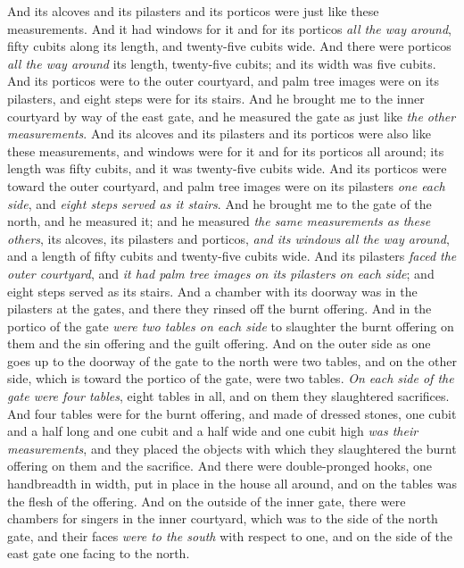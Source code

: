 \begin{biblechapter}
\verse And its alcoves and its pilasters and its porticos were just like these measurements. And it had windows for it and for its porticos \textit{all the way around}, fifty cubits along its length, and twenty-five cubits wide.
\verse And there were porticos \textit{all the way around} its length, twenty-five cubits; and its width was five cubits.
\verse And its porticos were to the outer courtyard, and palm tree images were on its pilasters, and eight steps were for its stairs.
\verse And he brought me to the inner courtyard by way of the east gate, and he measured the gate as just like \textit{the other measurements}.
\verse And its alcoves and its pilasters and its porticos were also like these measurements, and windows were for it and for its porticos all around; its length was fifty cubits, and it was twenty-five cubits wide.
\verse And its porticos were toward the outer courtyard, and palm tree images were on its pilasters \textit{one each side}, and \textit{eight steps served as it stairs}.
\verse And he brought me to the gate of the north, and he measured it; and he measured \textit{the same measurements as these others},
\verse its alcoves, its pilasters and porticos, \textit{and its windows} \textit{all the way around}, and a length of fifty cubits and twenty-five cubits wide.
\verse And its pilasters \textit{faced the outer courtyard}, and \textit{it had palm tree images on its pilasters} \textit{on each side}; and eight steps served as its stairs.
 And a chamber with its doorway was in the pilasters at the gates, and there they rinsed off the burnt offering.
\verse And in the portico of the gate \textit{were two tables on each side} to slaughter the burnt offering on them and the sin offering and the guilt offering.
\verse And on the outer side as one goes up to the doorway of the gate to the north were two tables, and on the other side, which is toward the portico of the gate, were two tables.
\verse \textit{On each side of the gate were four tables}, eight tables in all, and on them they slaughtered sacrifices.
\verse And four tables were for the burnt offering, and made of dressed stones, one cubit and a half long and one cubit and a half wide and one cubit high \textit{was their measurements}, and they placed the objects with which they slaughtered the burnt offering on them and the sacrifice.
\verse And there were double-pronged hooks, one handbreadth in width, put in place in the house all around, and on the tables was the flesh of the offering.
 And on the outside of the inner gate, there were chambers for singers in the inner courtyard, which was to the side of the north gate, and their faces \textit{were to the south} with respect to one, and on the side of the east gate one facing to the north.

\end{biblechapter}
